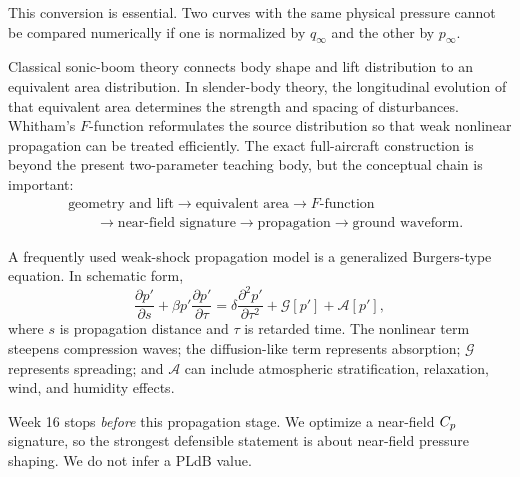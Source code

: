 This conversion is essential. Two curves with the same physical pressure cannot be compared numerically if one is normalized by $q_\infty$ and the other by $p_\infty$.


Classical sonic-boom theory connects body shape and lift distribution to an equivalent area distribution. In slender-body theory, the longitudinal evolution of that equivalent area determines the strength and spacing of disturbances. Whitham's $F$-function reformulates the source distribution so that weak nonlinear propagation can be treated efficiently. The exact full-aircraft construction is beyond the present two-parameter teaching body, but the conceptual chain is important:
\begin{equation}
 \begin{aligned}
 &\text{geometry and lift}\rightarrow \text{equivalent area}\rightarrow F\text{-function}\\
 &\qquad\rightarrow \text{near-field signature}\rightarrow \text{propagation}\rightarrow \text{ground waveform}.
 \end{aligned}
\end{equation}

A frequently used weak-shock propagation model is a generalized Burgers-type equation. In schematic form,
\begin{equation}
 \frac{\partial p'}{\partial s}
 +\beta p'\frac{\partial p'}{\partial\tau}
 =\delta\frac{\partial^2p'}{\partial\tau^2}
 +\mathcal{G}[p']+\mathcal{A}[p'],
\end{equation}
where $s$ is propagation distance and $\tau$ is retarded time. The nonlinear term steepens compression waves; the diffusion-like term represents absorption; $\mathcal{G}$ represents spreading; and $\mathcal{A}$ can include atmospheric stratification, relaxation, wind, and humidity effects.

Week 16 stops \emph{before} this propagation stage. We optimize a near-field $C_p$ signature, so the strongest defensible statement is about near-field pressure shaping. We do not infer a PLdB value.

\newpage
